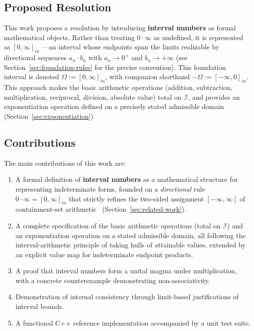 \documentclass[11pt,a4paper]{article}
\theoremstyle{paperdef}
\newcommand{\Iset}{\mathcal{I}}
\newcommand{\inI}[1]{[#1]_{in}}
\begin{document}
\subsection{Proposed Resolution}

This work proposes a resolution by introducing \textbf{interval
numbers} as formal mathematical objects. Rather than treating
$0 \cdot \infty$ as undefined, it is represented as $\inI{0, \infty}$
---an interval whose endpoints span the limits realizable by
directional sequences $a_n \cdot b_n$ with $a_n \to 0^{+}$ and
$b_n \to +\infty$ (see Section~\ref{sec:foundation-rules} for the
precise convention). This foundation interval is denoted
$\Omega := \inI{0, \infty}$, with companion shorthand
$-\Omega := \inI{-\infty, 0}$. This approach makes the basic arithmetic
operations (addition, subtraction, multiplication, reciprocal,
division, absolute value) total on $\Iset$, and provides an
exponentiation operation defined on a precisely stated admissible
domain (Section~\ref{sec:exponentiation}).

\subsection{Contributions}

The main contributions of this work are:
\begin{enumerate}[leftmargin=2em]
  \item A formal definition of \textbf{interval numbers} as a
    mathematical structure for representing indeterminate forms,
    founded on a \emph{directional} rule
    $0 \cdot \infty = \inI{0, \infty}$ that strictly refines the
    two-sided assignment $[-\infty, \infty]$ of containment-set
    arithmetic~\cite{Walster1998,PryceCorliss2006}
    (Section~\ref{sec:related-work}).
  \item A complete specification of the basic arithmetic operations
    (total on $\Iset$) and an exponentiation operation on a stated
    admissible domain, all following the interval-arithmetic principle
    of taking hulls of attainable values, extended by an explicit value
    map for indeterminate endpoint products.
  \item A proof that interval numbers form a unital magma under
    multiplication, with a concrete counterexample demonstrating
    non-associativity.
  \item Demonstration of internal consistency through limit-based
    justifications of interval bounds.
  \item A functional C++ reference implementation accompanied by a
    unit test suite.
\end{enumerate}
\end{document}
